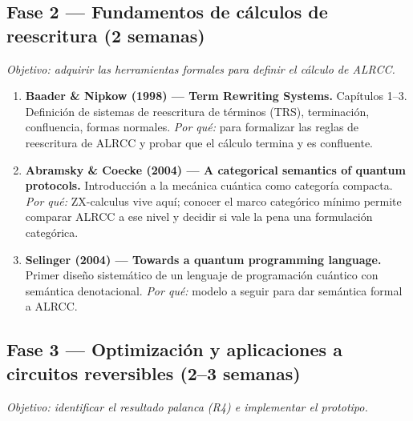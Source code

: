 \documentclass[12pt, a4paper]{article}
\begin{document}
\subsection*{Fase 2 --- Fundamentos de cálculos de reescritura (2 semanas)}

\textit{Objetivo: adquirir las herramientas formales para definir el cálculo de ALRCC.}

\begin{enumerate}[resume]
  \item \textbf{Baader \& Nipkow (1998) --- Term Rewriting Systems.}
        Capítulos 1--3. Definición de sistemas de reescritura de términos (TRS),
        terminación, confluencia, formas normales.
        \textit{Por qué:} para formalizar las reglas de reescritura de ALRCC
        y probar que el cálculo termina y es confluente.

  \item \textbf{Abramsky \& Coecke (2004) --- A categorical semantics of quantum protocols.}
        Introducción a la mecánica cuántica como categoría compacta.
        \textit{Por qué:} ZX-calculus vive aquí; conocer el marco categórico
        mínimo permite comparar ALRCC a ese nivel y decidir si vale la pena
        una formulación categórica.

  \item \textbf{Selinger (2004) --- Towards a quantum programming language.}
        Primer diseño sistemático de un lenguaje de programación cuántico con
        semántica denotacional.
        \textit{Por qué:} modelo a seguir para dar semántica formal a ALRCC.
\end{enumerate}

\subsection*{Fase 3 --- Optimización y aplicaciones a circuitos reversibles (2--3 semanas)}

\textit{Objetivo: identificar el resultado palanca (R4) e implementar el prototipo.}
\end{document}
